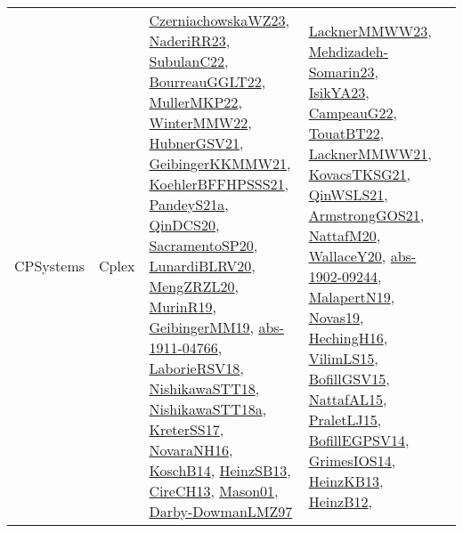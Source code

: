 {\begin{longtable}{lp{3cm}>{\raggedright}p{6cm}>{\raggedright}p{6cm}p{8cm}}
CPSystems & Cplex & \href{articles/CzerniachowskaWZ23.pdf}{CzerniachowskaWZ23}\cite{CzerniachowskaWZ23}, \href{articles/NaderiRR23.pdf}{NaderiRR23}\cite{NaderiRR23}, \href{articles/SubulanC22.pdf}{SubulanC22}\cite{SubulanC22}, \href{articles/BourreauGGLT22.pdf}{BourreauGGLT22}\cite{BourreauGGLT22}, \href{articles/MullerMKP22.pdf}{MullerMKP22}\cite{MullerMKP22}, \href{papers/WinterMMW22.pdf}{WinterMMW22}\cite{WinterMMW22}, \href{articles/HubnerGSV21.pdf}{HubnerGSV21}\cite{HubnerGSV21}, \href{papers/GeibingerKKMMW21.pdf}{GeibingerKKMMW21}\cite{GeibingerKKMMW21}, \href{articles/KoehlerBFFHPSSS21.pdf}{KoehlerBFFHPSSS21}\cite{KoehlerBFFHPSSS21}, \href{articles/PandeyS21a.pdf}{PandeyS21a}\cite{PandeyS21a}, \href{articles/QinDCS20.pdf}{QinDCS20}\cite{QinDCS20}, \href{articles/SacramentoSP20.pdf}{SacramentoSP20}\cite{SacramentoSP20}, \href{articles/LunardiBLRV20.pdf}{LunardiBLRV20}\cite{LunardiBLRV20}, \href{articles/MengZRZL20.pdf}{MengZRZL20}\cite{MengZRZL20}, \href{papers/MurinR19.pdf}{MurinR19}\cite{MurinR19}, \href{papers/GeibingerMM19.pdf}{GeibingerMM19}\cite{GeibingerMM19}, \href{articles/abs-1911-04766.pdf}{abs-1911-04766}\cite{abs-1911-04766}, \href{articles/LaborieRSV18.pdf}{LaborieRSV18}\cite{LaborieRSV18}, \href{papers/NishikawaSTT18.pdf}{NishikawaSTT18}\cite{NishikawaSTT18}, \href{papers/NishikawaSTT18a.pdf}{NishikawaSTT18a}\cite{NishikawaSTT18a}, \href{articles/KreterSS17.pdf}{KreterSS17}\cite{KreterSS17}, \href{articles/NovaraNH16.pdf}{NovaraNH16}\cite{NovaraNH16}, \href{papers/KoschB14.pdf}{KoschB14}\cite{KoschB14}, \href{articles/HeinzSB13.pdf}{HeinzSB13}\cite{HeinzSB13}, \href{papers/CireCH13.pdf}{CireCH13}\cite{CireCH13}, \href{articles/Mason01.pdf}{Mason01}\cite{Mason01}, \href{articles/Darby-DowmanLMZ97.pdf}{Darby-DowmanLMZ97}\cite{Darby-DowmanLMZ97} & \href{articles/LacknerMMWW23.pdf}{LacknerMMWW23}\cite{LacknerMMWW23}, \href{papers/Mehdizadeh-Somarin23.pdf}{Mehdizadeh-Somarin23}\cite{Mehdizadeh-Somarin23}, \href{articles/IsikYA23.pdf}{IsikYA23}\cite{IsikYA23}, \href{articles/CampeauG22.pdf}{CampeauG22}\cite{CampeauG22}, \href{papers/TouatBT22.pdf}{TouatBT22}\cite{TouatBT22}, \href{papers/LacknerMMWW21.pdf}{LacknerMMWW21}\cite{LacknerMMWW21}, \href{papers/KovacsTKSG21.pdf}{KovacsTKSG21}\cite{KovacsTKSG21}, \href{articles/QinWSLS21.pdf}{QinWSLS21}\cite{QinWSLS21}, \href{papers/ArmstrongGOS21.pdf}{ArmstrongGOS21}\cite{ArmstrongGOS21}, \href{papers/NattafM20.pdf}{NattafM20}\cite{NattafM20}, \href{articles/WallaceY20.pdf}{WallaceY20}\cite{WallaceY20}, \href{articles/abs-1902-09244.pdf}{abs-1902-09244}\cite{abs-1902-09244}, \href{papers/MalapertN19.pdf}{MalapertN19}\cite{MalapertN19}, \href{articles/Novas19.pdf}{Novas19}\cite{Novas19}, \href{papers/HechingH16.pdf}{HechingH16}\cite{HechingH16}, \href{papers/VilimLS15.pdf}{VilimLS15}\cite{VilimLS15}, \href{papers/BofillGSV15.pdf}{BofillGSV15}\cite{BofillGSV15}, \href{articles/NattafAL15.pdf}{NattafAL15}\cite{NattafAL15}, \href{papers/PraletLJ15.pdf}{PraletLJ15}\cite{PraletLJ15}, \href{papers/BofillEGPSV14.pdf}{BofillEGPSV14}\cite{BofillEGPSV14}, \href{articles/GrimesIOS14.pdf}{GrimesIOS14}\cite{GrimesIOS14}, \href{papers/HeinzKB13.pdf}{HeinzKB13}\cite{HeinzKB13}, \href{papers/HeinzB12.pdf}{HeinzB12}\cite{HeinzB12}, 
\end{longtable}}
